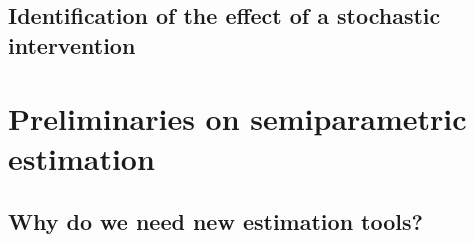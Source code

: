 \documentclass[
  12pt,
]{book}
\theoremstyle{definition}
\theoremstyle{definition}
\theoremstyle{definition}
\newcommand{\1}{\mathbbm{1}}
\begin{document}
\hypertarget{identification-of-the-effect-of-a-stochastic-intervention}{%
\section{Identification of the effect of a stochastic intervention}\label{identification-of-the-effect-of-a-stochastic-intervention}}

\hypertarget{preliminaries-on-semiparametric-estimation}{%
\chapter{Preliminaries on semiparametric estimation}\label{preliminaries-on-semiparametric-estimation}}

\hypertarget{why-do-we-need-new-estimation-tools}{%
\section{Why do we need new estimation tools?}\label{why-do-we-need-new-estimation-tools}}
\end{document}
